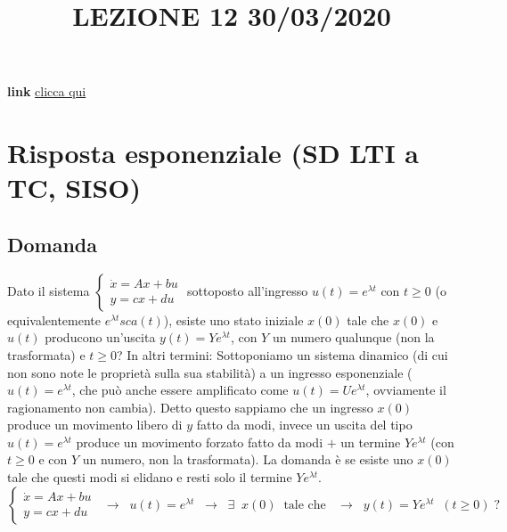 \newpage
\title{LEZIONE 12 30/03/2020}\newline
\textbf{link} \href{https://web.microsoftstream.com/video/05bd4cd5-c99f-4a6c-9334-733e9a60083a?list=user&userId=faa91214-a6f5-40d7-8875-253fd49b8ce1}{clicca qui}
\section{Risposta esponenziale (SD LTI a TC, SISO)}
\subsection{Domanda}
Dato il sistema $\begin{cases}
    \dot{x} = Ax +bu\\ y = cx +du
\end{cases}$ sottoposto all'ingresso $u(t) = e^{\lambda t}$ con $t\geq 0$ (o equivalentemente $e^{\lambda t} sca(t)$), esiste uno stato iniziale $x(0)$ tale che $x(0)$ e $u(t)$ producono un'uscita $y(t)= Y e^{\lambda t}$, con $Y$ un numero qualunque (non la trasformata) e $t \geq 0$?\newline
\newline
In altri termini:\newline
Sottoponiamo un sistema dinamico (di cui non sono note le proprietà sulla sua stabilità) a un ingresso esponenziale ($u(t) = e^{\lambda t}$, che può anche essere amplificato come $u(t) = U e^{\lambda t}$, ovviamente il ragionamento non cambia). Detto questo sappiamo che un ingresso $x(0)$ produce un movimento libero di $y$ fatto da modi, invece un uscita del tipo $u(t) = e^{\lambda t}$ produce un movimento forzato fatto da modi $+$ un termine $Ye^{\lambda t}$ (con $t \geq 0$ e con $Y$ un numero, non la trasformata). La domanda è se esiste uno $x(0)$ tale che questi modi si elidano e resti solo il termine $Ye^{\lambda t}$.
\[
    \begin{cases}
        \dot{x} = Ax +bu\\ 
        y = cx +du
    \end{cases} \;\; \longrightarrow \;\; u(t) = e^{\lambda t} \;\; \longrightarrow \;\; \exists \;\;x(0) \;\;\text{tale che } \;\; \longrightarrow \;\; y(t) = Y e^{\lambda t} \;\;(t\geq 0) \;?
\]
